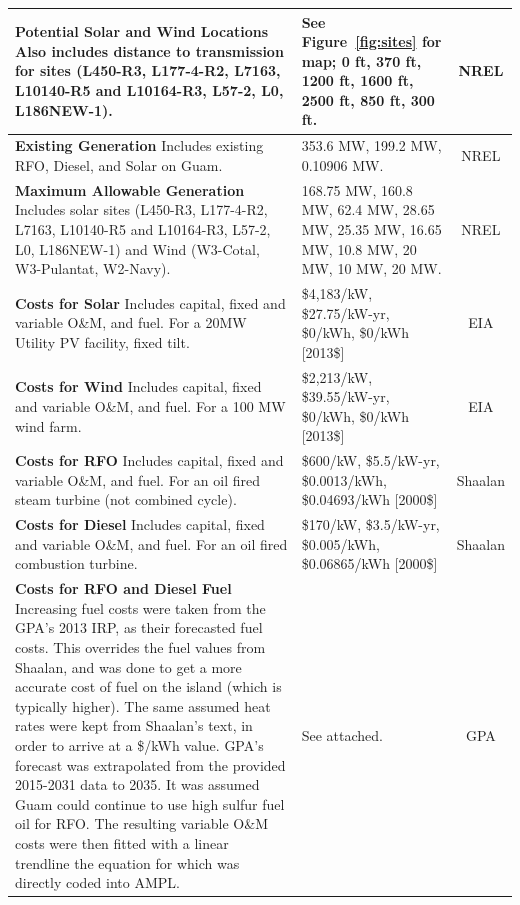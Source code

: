 \documentclass[12pt,letterpaper,fleqn]{article}
\begin{document}
\begin{center}
\begin{longtable}{| p{10cm} | p{4cm} | c | }
    \textbf{Potential Solar and Wind Locations} Also includes distance
    to transmission for sites (L450-R3, L177-4-R2, L7163, L10140-R5
    and L10164-R3, L57-2, L0, L186NEW-1). & See Figure~\ref{fig:sites}
    for map; 0 ft, 370 ft, 1200 ft, 1600 ft, 2500 ft, 850 ft, 300 ft. &
    NREL \cite{misty} \\\hline

    \textbf{Existing Generation} Includes existing RFO, Diesel, and
    Solar on Guam. & 353.6 MW, 199.2 MW, 0.10906 MW. & NREL
    \cite{misty} \\\hline

    \textbf{Maximum Allowable Generation} Includes solar sites
    (L450-R3, L177-4-R2, L7163, L10140-R5 and L10164-R3, L57-2, L0,
    L186NEW-1) and Wind (W3-Cotal, W3-Pulantat, W2-Navy). & 168.75 MW,
    160.8 MW, 62.4 MW, 28.65 MW, 25.35 MW, 16.65 MW, 10.8 MW, 20 MW,
    10 MW, 20 MW. & NREL \cite{misty} \\\hline

    \textbf{Costs for Solar} Includes capital, fixed and variable
    O\&M, and fuel. For a 20MW Utility PV facility, fixed tilt. &
    \$4,183/kW, \$27.75/kW-yr, \$0/kWh, \$0/kWh [2013\$] & EIA
    \cite{eia13} \\\hline

    \textbf{Costs for Wind} Includes capital, fixed and variable O\&M,
    and fuel. For a 100 MW wind farm. & \$2,213/kW, \$39.55/kW-yr,
    \$0/kWh, \$0/kWh [2013\$] & EIA \cite{eia13} \\\hline

    \textbf{Costs for RFO} Includes capital, fixed and variable O\&M,
    and fuel. For an oil fired steam turbine (not combined cycle). &
    \$600/kW, \$5.5/kW-yr, \$0.0013/kWh, \$0.04693/kWh [2000\$] &
    Shaalan \cite{shaalan01} \\\hline

    \textbf{Costs for Diesel} Includes capital, fixed and variable
    O\&M, and fuel. For an oil fired combustion turbine. & \$170/kW,
    \$3.5/kW-yr, \$0.005/kWh, \$0.06865/kWh [2000\$] & Shaalan
    \cite{shaalan01} \\\hline

    \textbf{Costs for RFO and Diesel Fuel} Increasing fuel costs were
    taken from the GPA's 2013 IRP, as their forecasted fuel
    costs. This overrides the fuel values from Shaalan, and was done
    to get a more accurate cost of fuel on the island (which is
    typically higher). The same assumed heat rates were kept from
    Shaalan's text, in order to arrive at a \$/kWh value. GPA's
    forecast was extrapolated from the provided 2015-2031 data to
    2035. It was assumed Guam could continue to use high sulfur fuel
    oil for RFO. The resulting variable O\&M costs were then fitted
    with a linear trendline the equation for which was directly coded
    into AMPL. & See attached. & GPA \cite{cruz13} \\\hline


\end{longtable}
\end{center}
\end{document}
